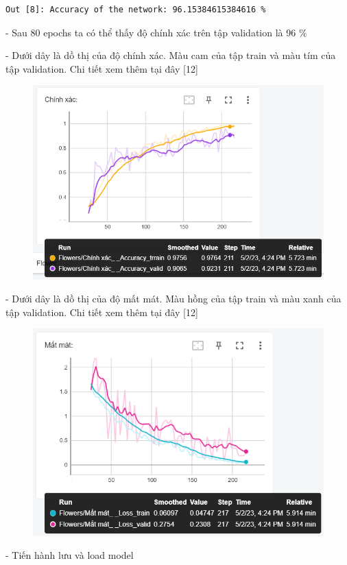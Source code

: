 \documentclass[12pt, a4paper]{article}
\begin{document}
\begin{verbatim}
Out [8]: Accuracy of the network: 96.15384615384616 %
\end{verbatim}
\par- Sau 80 epochs ta có thể thấy độ chính xác trên tập validation là 96 $\%$
\par- Dưới dây là dồ thị của độ chính xác. Màu cam của tập train và màu tím của tập validation.
Chi tiết xem thêm tại đây [12]

\begin{figure}[h] %
    \centering
    \includegraphics[scale = 0.6]{Img/Flowers/P2.png}
\end{figure}

\par - Dưới dây là dồ thị của độ mất mát. Màu hồng của tập train và màu xanh của tập validation. Chi tiết xem thêm tại đây [12]
\begin{figure}[h] %
    \centering
    \includegraphics[scale = 0.65]{Img/Flowers/P3.png}
\end{figure}
\par - Tiến hành lưu và load model 
\end{document}
